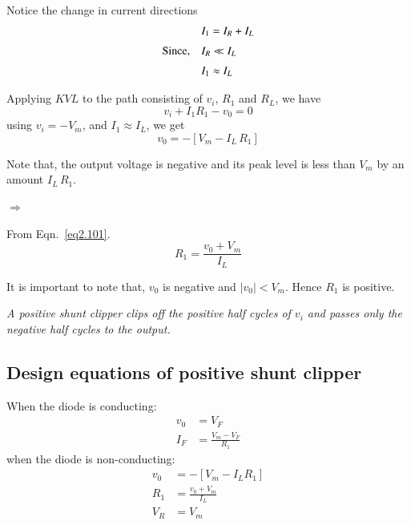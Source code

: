 Notice the change in current directions
\begin{align}
& I_{1}=I_{R}+I_{L}\notag\\[3pt]
\text{Since,}\quad & I_{R}\ll I_{L}\notag\\[3pt]
& I_{1}\approx I_{L}\label{eq2.100}
\end{align}

Applying $KVL$ to the path consisting of $v_{i}$, $R_{1}$ and $R_{L}$, we have
$$
v_{i}+I_{1}R_{1}-v_{0}=0
$$
using $v_{i}=-V_{m}$, and $I_{1}\approx I_{L}$, we get
\begin{equation}
v_{0}=-[V_{m}-I_{L}\,R_{1}]\label{eq2.101}
\end{equation}

Note that, the output voltage is negative and its peak level is less than $V_{m}$ by an amount $I_{L}\,R_{1}$.

$\Rightarrow$

From Eqn.~\eqref{eq2.101}.
\begin{equation}
R_{1}=\frac{v_{0}+V_{m}}{I_{L}}\label{eq2.102}
\end{equation}

It is important to note that, $v_{0}$ is negative and $|v_{0}|<V_{m}$. Hence $R_{1}$ is positive.

\medskip


{\em A positive shunt clipper clips off the positive half cycles of $v_{i}$ and passes only the negative half cycles to the output.}

\subsection{Design equations of positive shunt clipper}\label{sec2.31.2}

When the diode is conducting:
\begin{align}
v_{0} &= V_{F}\label{eq2.103}\\[4pt]
I_{F} &= \frac{V_{m}-V_{F}}{R_{1}}\label{eq2.104}
\end{align}
when the diode is non-conducting:
\begin{align}
v_{0} &= -[V_{m}-I_{L}R_{1}]\label{eq2.105}\\[4pt]
R_{1} &= \frac{v_{0}+V_{m}}{I_{L}}\label{eq2.106}\\[4pt]
V_{R} &= V_{m}\label{eq2.107}
\end{align}

